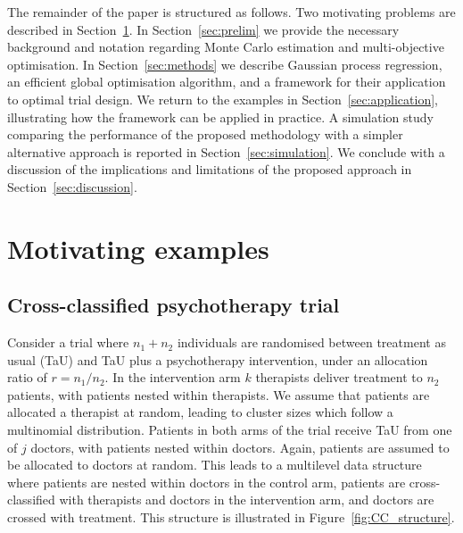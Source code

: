 \documentclass{article} %
\begin{document}
The remainder of the paper is structured as follows. Two motivating problems are described in Section~\ref{sec:examples}. In Section~\ref{sec:prelim} we provide the necessary background and notation regarding Monte Carlo estimation and multi-objective optimisation. In Section~\ref{sec:methods} we describe Gaussian process regression, an efficient global optimisation algorithm, and a framework for their application to optimal trial design. We return to the examples in Section~\ref{sec:application}, illustrating how the framework can be applied in practice. A simulation study comparing the performance of the proposed methodology with a simpler alternative approach is reported in Section~\ref{sec:simulation}. We conclude with a discussion of the implications and limitations of the proposed approach in Section~\ref{sec:discussion}.


\section{Motivating examples}\label{sec:examples}

\subsection{Cross-classified psychotherapy trial}\label{sec:CC}

Consider a trial where $n_{1} + n_{2}$ individuals are randomised between treatment as usual (TaU) and TaU plus a psychotherapy intervention, under an allocation ratio of $r = n_{1}/n_{2}$. In the intervention arm $k$ therapists deliver treatment to $n_{2}$ patients, with patients nested within therapists. We assume that patients are allocated a therapist at random, leading to cluster sizes which follow a multinomial distribution. Patients in both arms of the trial receive TaU from one of $j$ doctors, with patients nested within doctors. Again, patients are assumed to be allocated to doctors at random. This leads to a multilevel data structure where patients are nested within doctors in the control arm, patients are cross-classified with therapists and doctors in the intervention arm, and doctors are crossed with treatment. This structure is illustrated in Figure~\ref{fig:CC_structure}. 
\end{document}

